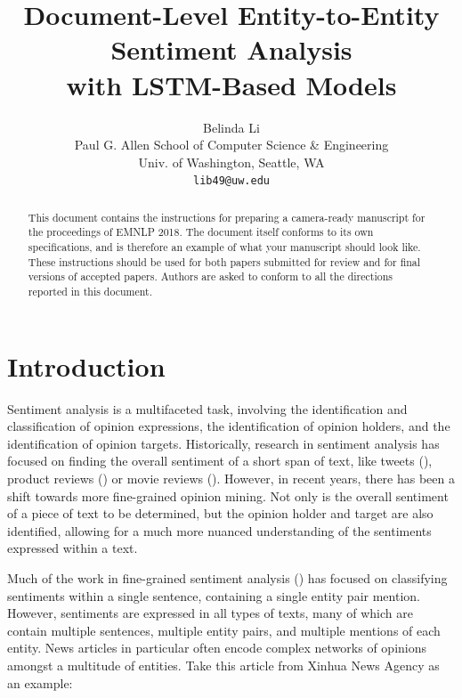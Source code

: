 \documentclass[11pt,a4paper]{article}
\title{Document-Level Entity-to-Entity Sentiment Analysis \\ with LSTM-Based Models}
\author{Belinda Li \\
  Paul G. Allen School of Computer Science \& Engineering \\
  Univ. of Washington, Seattle, WA \\
  {\tt lib49@uw.edu} \\}
\date{}
\newcommand\confname{EMNLP 2018}
\begin{document}
\maketitle
\begin{abstract}
  This document contains the instructions for preparing a camera-ready
  manuscript for the proceedings of \confname{}. The document itself
  conforms to its own specifications, and is therefore an example of
  what your manuscript should look like. These instructions should be
  used for both papers submitted for review and for final versions of
  accepted papers.  Authors are asked to conform to all the directions
  reported in this document.
\end{abstract}

\section{Introduction}
Sentiment analysis is a multifaceted task, involving the identification and classification of opinion expressions, the identification of opinion holders, and the identification of opinion targets.
Historically, research in sentiment analysis has focused on finding the overall sentiment of a short span of text, like tweets (), product reviews () or movie reviews ().
However, in recent years, there has been a shift towards more fine-grained opinion mining.
Not only is the overall sentiment of a piece of text to be determined, but the opinion holder and target are also identified, allowing for a much more nuanced understanding of the sentiments expressed within a text.
\par Much of the work in fine-grained sentiment analysis () has focused on classifying sentiments within a single sentence, containing a single entity pair mention.
However, sentiments are expressed in all types of texts, many of which are contain multiple sentences, multiple entity pairs, and multiple mentions of each entity.
News articles in particular often encode complex networks of opinions amongst a multitude of entities.
Take this article from Xinhua News Agency as an example:
\end{document}
